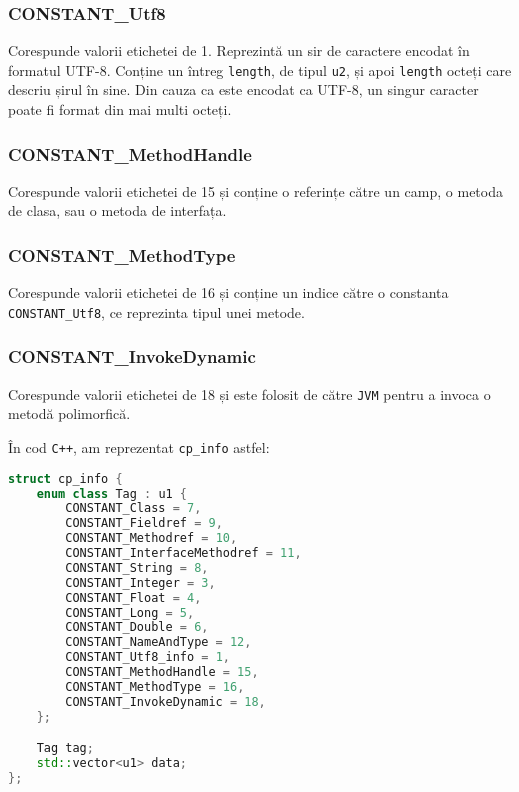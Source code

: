 \subsubsection{CONSTANT\_Utf8}

Corespunde valorii etichetei de 1. Reprezintă un sir de caractere
encodat în formatul UTF-8. Conține un întreg \texttt{length}, de tipul
\texttt{u2}, și apoi \texttt{length} octeți care descriu șirul în sine.
Din cauza ca este encodat ca UTF-8, un singur caracter poate fi format
din mai multi octeți.

\subsubsection{CONSTANT\_MethodHandle}

Corespunde valorii etichetei de 15 și conține o referințe către un camp,
o metoda de clasa, sau o metoda de interfața.

\subsubsection{CONSTANT\_MethodType}

Corespunde valorii etichetei de 16 și conține un indice către o
constanta \texttt{CONSTANT\_Utf8}, ce reprezinta tipul unei metode.

\subsubsection{CONSTANT\_InvokeDynamic}

Corespunde valorii etichetei de 18 și este folosit de către \texttt{JVM}
pentru a invoca o metodă polimorfică.

În cod \texttt{C++}, am reprezentat \texttt{cp\_info} astfel:

\begin{lstlisting}[language=C++]
struct cp_info {
    enum class Tag : u1 {
        CONSTANT_Class = 7,
        CONSTANT_Fieldref = 9,
        CONSTANT_Methodref = 10,
        CONSTANT_InterfaceMethodref = 11,
        CONSTANT_String = 8,
        CONSTANT_Integer = 3,
        CONSTANT_Float = 4,
        CONSTANT_Long = 5,
        CONSTANT_Double = 6,
        CONSTANT_NameAndType = 12,
        CONSTANT_Utf8_info = 1,
        CONSTANT_MethodHandle = 15,
        CONSTANT_MethodType = 16,
        CONSTANT_InvokeDynamic = 18,
    };

    Tag tag;
    std::vector<u1> data;
};
\end{lstlisting}

